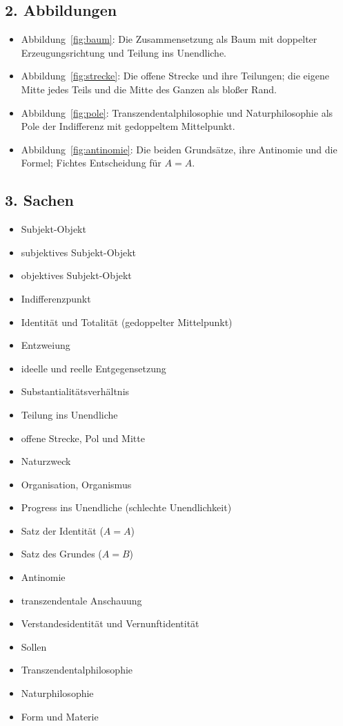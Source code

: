 \documentclass[11pt,a4paper]{article}
\newcommand{\SO}{Subjekt-Objekt}
\begin{document}
\subsection*{2. Abbildungen}
\begin{itemize}
\item Abbildung~\ref{fig:baum}: Die Zusammensetzung als Baum mit doppelter Erzeugungsrichtung und Teilung ins Unendliche.
\item Abbildung~\ref{fig:strecke}: Die offene Strecke und ihre Teilungen; die eigene Mitte jedes Teils und die Mitte des Ganzen als bloßer Rand.
\item Abbildung~\ref{fig:pole}: Transzendentalphilosophie und Naturphilosophie als Pole der Indifferenz mit gedoppeltem Mittelpunkt.
\item Abbildung~\ref{fig:antinomie}: Die beiden Grundsätze, ihre Antinomie und die Formel; Fichtes Entscheidung für $A = A$.
\end{itemize}

\subsection*{3. Sachen}
\begin{itemize}
\item \SO{}
\item subjektives \SO{}
\item objektives \SO{}
\item Indifferenzpunkt
\item Identität und Totalität (gedoppelter Mittelpunkt)
\item Entzweiung
\item ideelle und reelle Entgegensetzung
\item Substantialitätsverhältnis
\item Teilung ins Unendliche
\item offene Strecke, Pol und Mitte
\item Naturzweck
\item Organisation, Organismus
\item Progress ins Unendliche (schlechte Unendlichkeit)
\item Satz der Identität ($A = A$)
\item Satz des Grundes ($A = B$)
\item Antinomie
\item transzendentale Anschauung
\item Verstandesidentität und Vernunftidentität
\item Sollen
\item Transzendentalphilosophie
\item Naturphilosophie
\item Form und Materie
\end{itemize}
\end{document}

